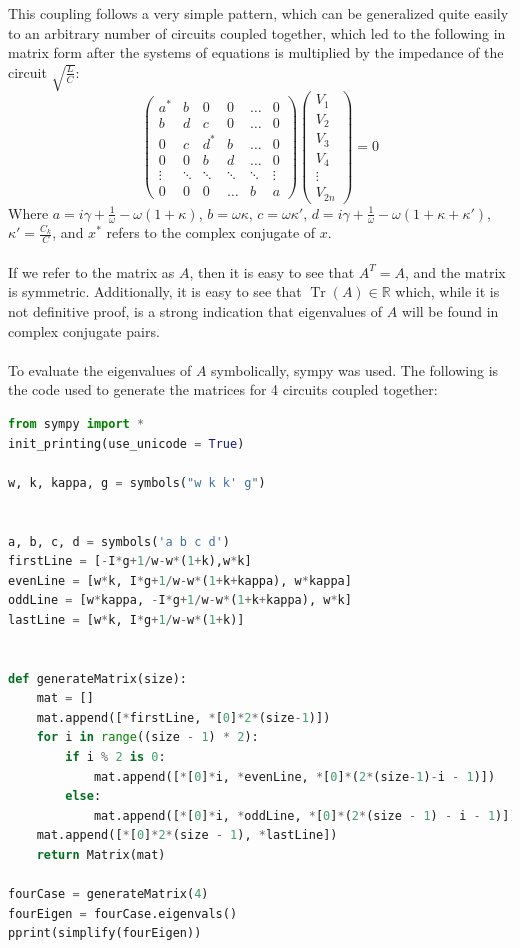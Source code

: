 \documentclass[11pt]{article}
\DeclareMathOperator{\Tr}{Tr}
\begin{document}
This coupling follows a very simple pattern, which can be generalized quite easily to an arbitrary number of circuits coupled together, which led to the following in matrix form after the systems of equations is multiplied by the impedance of the circuit $\sqrt{\frac{L}{C}}$:
\[
\begin{pmatrix}
a^{*} & b & 0 & 0 & \dots & 0\\
b & d & c & 0 & \dots & 0\\
0 & c & d^{*} & b & \dots & 0\\
0 & 0 & b & d & \dots & 0\\
\vdots & \ddots & \ddots & \ddots & \ddots & \vdots\\
0 & 0 & 0 & \dots & b & a
\end{pmatrix}
\begin{pmatrix}
V_1\\
V_2\\
V_3\\
V_4\\
\vdots\\
V_{2n}
\end{pmatrix} = 0
\]
Where $a = i \gamma + \frac{1}{\omega} - \omega (1 + \kappa)$, $b=\omega \kappa$, $c = \omega \kappa'$, $d = i \gamma + \frac{1}{\omega} - \omega (1 + \kappa + \kappa')$, $\kappa' = \frac{C_k}{C}$, and $x^{*}$ refers to the complex conjugate of $x$.
\\
\\
If we refer to the matrix as $A$, then it is easy to see that $A^T = A$, and the matrix is symmetric. Additionally, it is easy to see that $\Tr{(A)} \in \mathbb{R}$ which, while it is not definitive proof, is a strong indication that eigenvalues of $A$ will be found in complex conjugate pairs.
\\
\\
To evaluate the eigenvalues of $A$ symbolically, sympy was used. The following is the code used to generate the matrices for 4 circuits coupled together:

\begin{lstlisting}[language=Python]
from sympy import *
init_printing(use_unicode = True)

w, k, kappa, g = symbols("w k k' g")


a, b, c, d = symbols('a b c d')
firstLine = [-I*g+1/w-w*(1+k),w*k]
evenLine = [w*k, I*g+1/w-w*(1+k+kappa), w*kappa]
oddLine = [w*kappa, -I*g+1/w-w*(1+k+kappa), w*k]
lastLine = [w*k, I*g+1/w-w*(1+k)]


def generateMatrix(size):
    mat = []
    mat.append([*firstLine, *[0]*2*(size-1)])
    for i in range((size - 1) * 2):
        if i % 2 is 0:
            mat.append([*[0]*i, *evenLine, *[0]*(2*(size-1)-i - 1)])
        else:
            mat.append([*[0]*i, *oddLine, *[0]*(2*(size - 1) - i - 1)])
    mat.append([*[0]*2*(size - 1), *lastLine])
    return Matrix(mat)
 
fourCase = generateMatrix(4)
fourEigen = fourCase.eigenvals()
pprint(simplify(fourEigen))
\end{lstlisting}
\end{document}
